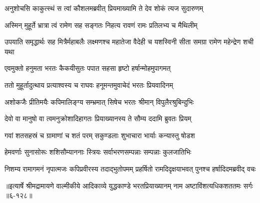 \twolineshloka
{अनुशोचसि काकुत्स्थं स त्वां कौशलमब्रवीत्}
{प्रियमाख्यामि ते देव शोकं त्यज सुदारुणम्} %

\twolineshloka
{अस्मिन् मुहूर्ते भ्रात्रा त्वं रामेण सह सङ्गतः}
{निहत्य रावणं रामः प्रतिलभ्य च मैथिलीम्} %

\threelineshloka
{उपयाति समृद्धार्थः सह मित्रैर्महाबलैः}
{लक्ष्मणश्च महातेजा वैदेही च यशस्विनी}
{सीता समग्रा रामेण महेन्द्रेण शची यथा} %

\twolineshloka
{एवमुक्तो हनुमता भरतः कैकयीसुतः}
{पपात सहसा हृष्टो हर्षान्मोहमुपागमत्} %

\twolineshloka
{ततो मुहूर्तादुत्थाय प्रत्याश्वस्य च राघवः}
{हनूमन्तमुवाचेदं भरतः प्रियवादिनम्} %

\twolineshloka
{अशोकजैः प्रीतिमयैः कपिमालिङ्ग्य सम्भ्रमात्}
{सिषेच भरतः श्रीमान् विपुलैरश्रुबिन्दुभिः} %

\twolineshloka
{देवो वा मानुषो वा त्वमनुक्रोशादिहागतः}
{प्रियाख्यानस्य ते सौम्य ददामि ब्रुवतः प्रियम्} %

\twolineshloka
{गवां शतसहस्रं च ग्रामाणां च शतं परम्}
{सकुण्डलाः शुभाचारा भार्याः कन्यास्तु षोडश} %

\twolineshloka
{हेमवर्णाः सुनासोरूः शशिसौम्याननाः स्त्रियः}
{सर्वाभरणसम्पन्नाः सम्पन्नाः कुलजातिभिः} %

\twolineshloka
{निशम्य रामागमनं नृपात्मजः कपिप्रवीरस्य तदाद्भुतोपमम्}
{प्रहर्षितो रामदिदृक्षयाभवत् पुनश्च हर्षादिदमब्रवीद् वचः} %


॥इत्यार्षे श्रीमद्रामायणे वाल्मीकीये आदिकाव्ये युद्धकाण्डे भरतप्रियाख्यानम् नाम अष्टाविंशत्यधिकशततमः सर्गः ॥६-१२८॥
